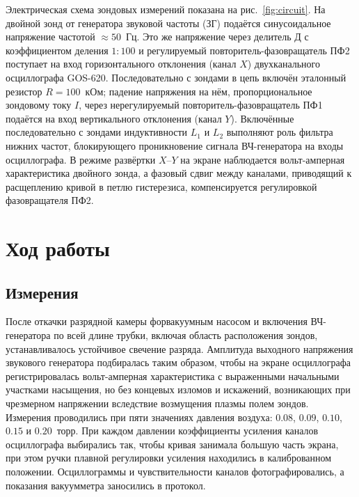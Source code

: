\documentclass[reprint, amsmath, amssymb, aps, pra, nofootinbib]{revtex4-2}
\begin{document}
Электрическая схема зондовых измерений показана на рис.~\ref{fig:circuit}. На двойной зонд от генератора звуковой частоты (ЗГ) подаётся синусоидальное напряжение частотой $\approx 50$~Гц. Это же напряжение через делитель Д с коэффициентом деления $1{:}100$ и регулируемый повторитель-фазовращатель ПФ2 поступает на вход горизонтального отклонения (канал $X$) двухканального осциллографа GOS-620. Последовательно с зондами в цепь включён эталонный резистор $R = 100$~кОм; падение напряжения на нём, пропорциональное зондовому току $I$, через нерегулируемый повторитель-фазовращатель ПФ1 подаётся на вход вертикального отклонения (канал $Y$). Включённые последовательно с зондами индуктивности $L_1$ и $L_2$ выполняют роль фильтра нижних частот, блокирующего проникновение сигнала ВЧ-генератора на входы осциллографа. В режиме развёртки $X$--$Y$ на экране наблюдается вольт-амперная характеристика двойного зонда, а фазовый сдвиг между каналами, приводящий к расщеплению кривой в петлю гистерезиса, компенсируется регулировкой фазовращателя ПФ2.

\section{Ход работы}

\subsection{Измерения}

После откачки разрядной камеры форвакуумным насосом и включения ВЧ-генератора по всей длине трубки, включая область расположения зондов, устанавливалось устойчивое свечение разряда. Амплитуда выходного напряжения звукового генератора подбиралась таким образом, чтобы на экране осциллографа регистрировалась вольт-амперная характеристика с выраженными начальными участками насыщения, но без концевых изломов и искажений, возникающих при чрезмерном напряжении вследствие возмущения плазмы полем зондов. Измерения проводились при пяти значениях давления воздуха: $0.08$, $0.09$, $0.10$, $0.15$ и $0.20$~торр. При каждом давлении коэффициенты усиления каналов осциллографа выбирались так, чтобы кривая занимала большую часть экрана, при этом ручки плавной регулировки усиления находились в калиброванном положении. Осциллограммы и чувствительности каналов фотографировались, а показания вакуумметра заносились в протокол.
\end{document}
